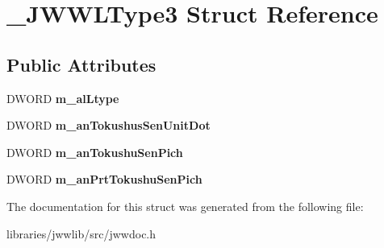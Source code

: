 \hypertarget{struct__JWWLType3}{\section{\-\_\-\-J\-W\-W\-L\-Type3 Struct Reference}
\label{struct__JWWLType3}
}
\subsection*{Public Attributes}
\begin{DoxyCompactItemize}
\item 
\hypertarget{struct__JWWLType3_a186f6d26ac1606a11140a79f1829fff1}{D\-W\-O\-R\-D {\bfseries m\-\_\-al\-Ltype}}\label{struct__JWWLType3_a186f6d26ac1606a11140a79f1829fff1}

\item 
\hypertarget{struct__JWWLType3_a80629766b7d1a90d94298bc54b2578b3}{D\-W\-O\-R\-D {\bfseries m\-\_\-an\-Tokushus\-Sen\-Unit\-Dot}}\label{struct__JWWLType3_a80629766b7d1a90d94298bc54b2578b3}

\item 
\hypertarget{struct__JWWLType3_a5290202f646b4e629ab0ec75524c9959}{D\-W\-O\-R\-D {\bfseries m\-\_\-an\-Tokushu\-Sen\-Pich}}\label{struct__JWWLType3_a5290202f646b4e629ab0ec75524c9959}

\item 
\hypertarget{struct__JWWLType3_ad261c3832222463ae66b3761b9a307ec}{D\-W\-O\-R\-D {\bfseries m\-\_\-an\-Prt\-Tokushu\-Sen\-Pich}}\label{struct__JWWLType3_ad261c3832222463ae66b3761b9a307ec}

\end{DoxyCompactItemize}


The documentation for this struct was generated from the following file\-:\begin{DoxyCompactItemize}
\item 
libraries/jwwlib/src/jwwdoc.\-h\end{DoxyCompactItemize}
